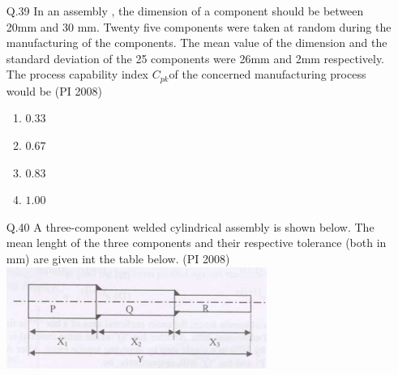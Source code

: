 \documentclass[journal,12pt,onecolumn]{IEEEtran}
\theoremstyle{remark}
\begin{document}
\begin{enumerate}
\begin{multicols}{4}
    \begin{enumerate}[label=(\Alph*)]
        \item $700^{\circ}C$
        \item $625^{\circ}C$
        \item $550^{\circ}C$
        \item $400^{\circ}C$
    \end{enumerate}
\end{multicols}
\vspace{1cm}
 \item[\textnormal{Q.39}] In an assembly , the dimension of a component should be between 20mm and 30 mm. Twenty five components were taken at random during the manufacturing of the components. The mean value of the dimension and the standard deviation of the 25 components were 26mm and 2mm respectively. The process capability index $C_{pk}$of the concerned manufacturing process 
 would be 
    \hfill{(PI 2008)}
    \begin{multicols}{4}
    \begin{enumerate}[label=(\Alph*)]
        \item $0.33$
        \item $0.67$
        \item $0.83$
        \item $1.00$
    \end{enumerate}
\end{multicols}
\vspace{1cm}
 \item[\textnormal{Q.40}] A three-component welded cylindrical assembly is shown below. The mean lenght of the three components and their respective tolerance (both in mm) are given int the table below. 
    \hfill{(PI 2008)}\\
    
    
        \includegraphics[width=0.5\linewidth]{figures/gate-pi-2008-40.png}
        \label{fig:placeholder}
        

\end{enumerate}
\end{document}

